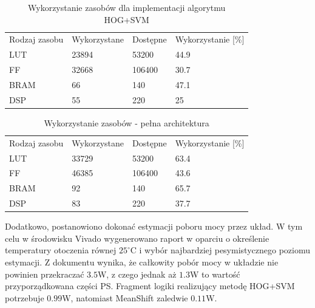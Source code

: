 \begin{table}[ht]
	\centering
	\caption{Wykorzystanie zasobów dla implementacji algorytmu HOG+SVM}
	\captionsetup{justification=centering,margin=1cm}
	\begin{tabular}{|P{3cm} |P{3cm} |P{3cm}|P{4cm}|}	
		\hline
		 Rodzaj zasobu & Wykorzystane & Dostępne & Wykorzystanie [\%]\\ 
		LUT		& 23894	& 53200 & 44.9\\ 
		\hline
		FF		& 32668	& 106400 & 30.7\\ 
		\hline
		BRAM	& 66	& 140 & 47.1\\ 
		\hline
		DSP		& 55	& 220 & 25\\ 
		\hline		
	\end{tabular}
	\label{tab:utilizationHOG}
\end{table}

\begin{table}[ht]
	\centering
	\caption{Wykorzystanie zasobów - pełna architektura}	
	\captionsetup{justification=centering,margin=1cm}
	\begin{tabular}{|P{3cm} |P{3cm} |P{3cm}|P{4cm}|}	
		\hline
		 Rodzaj zasobu & Wykorzystane & Dostępne & Wykorzystanie [\%]\\ 
		LUT		& 33729	& 53200 & 63.4\\ 
		\hline
		FF		& 46385	& 106400 & 43.6\\ 
		\hline
		BRAM	& 92	& 140 & 65.7\\ 
		\hline
		DSP		& 83	& 220 & 37.7\\ 
		\hline		
	\end{tabular}
	\label{tab:utilizationOverall}
\end{table} 

Dodatkowo, postanowiono dokonać estymacji poboru mocy przez układ. W tym celu w środowisku Vivado wygenerowano raport w oparciu o określenie temperatury otoczenia równej $25^{\circ}$C i wybór najbardziej pesymistycznego poziomu estymacji. Z dokumentu wynika, że całkowity pobór mocy w układzie nie powinien przekraczać $3.5$W, z czego jednak aż $1.3$W to wartość przyporządkowana części PS. Fragment logiki realizujący metodę HOG+SVM potrzebuje $0.99$W, natomiast MeanShift zaledwie $0.11$W.